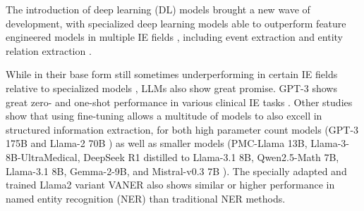 \documentclass[bs, english]{stthesis}
\begin{document}
The introduction of deep learning (DL) models brought a new wave of development, with specialized deep learning models able to outperform feature engineered models in multiple IE fields \cite{hahnMedicalInformationExtraction2020}, including event extraction \cite{maDICEDataEfficientClinical2023} and entity relation extraction \cite{hussainAIDrivenKnowledge2020}.

While in their base form still sometimes underperforming in certain IE fields relative to specialized models \cite{naguibFewshotClinicalEntity2024}, LLMs also show great promise. GPT-3 shows great zero- and one-shot performance in various clinical IE tasks \cite{agrawalLargeLanguageModels2022}. Other studies show that using fine-tuning allows a multitude of models to also excell in structured information extraction, for both high parameter count models (GPT-3 175B and Llama-2 70B \cite{dagdelenStructuredInformationExtraction2024}) as well as smaller models (PMC-Llama 13B, Llama-3-8B-UltraMedical, DeepSeek R1 distilled to Llama-3.1 8B, Qwen2.5-Math 7B, Llama-3.1 8B, Gemma-2-9B, and Mistral-v0.3 7B \cite{liuHumanlevelInformationExtraction2025}). The specially adapted and trained Llama2 variant VANER \cite{bianaVANERLeveragingLarge2024} also shows similar or higher performance in named entity recognition (NER) than traditional NER methods.

\end{document}
